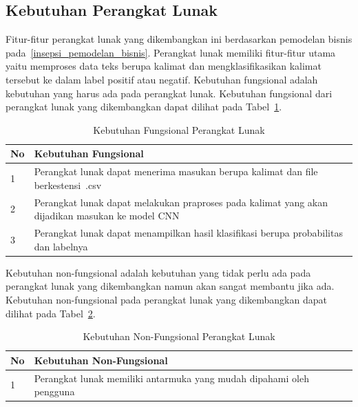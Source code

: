 \subsection{Kebutuhan Perangkat Lunak}
Fitur-fitur perangkat lunak yang dikembangkan ini berdasarkan pemodelan bisnis pada~\autoref{insepsi_pemodelan_bisnis}.
Perangkat lunak memiliki fitur-fitur utama yaitu memproses data teks berupa kalimat dan mengklasifikasikan
kalimat tersebut ke dalam label positif atau negatif. Kebutuhan fungsional adalah kebutuhan yang harus
ada pada perangkat lunak. Kebutuhan fungsional dari perangkat lunak yang dikembangkan dapat dilihat
pada Tabel~\ref{tab:kebutuhan_fungsional}.

\begin{table}[H]
  \centering
  \caption{Kebutuhan Fungsional Perangkat Lunak}
  \label{tab:kebutuhan_fungsional}
  \begin{tabularx}{\columnwidth}{|l|X|}
    \hline
    No & Kebutuhan Fungsional                                                                            \\ \hline
    1  & Perangkat lunak dapat menerima masukan berupa kalimat dan file berkestensi~.csv                 \\ \hline
    2  & Perangkat lunak dapat melakukan praproses pada kalimat yang akan dijadikan masukan ke model CNN \\ \hline
    3  & Perangkat lunak dapat menampilkan hasil klasifikasi berupa probabilitas dan labelnya            \\ \hline
  \end{tabularx}
\end{table}

Kebutuhan non-fungsional adalah kebutuhan yang tidak perlu ada pada perangkat lunak yang dikembangkan
namun akan sangat membantu jika ada. Kebutuhan non-fungsional pada perangkat lunak yang dikembangkan
dapat dilihat pada Tabel~\ref{tab:kebutuhan_nonfungsional}.

\begin{table}[H]
  \centering
  \caption{Kebutuhan Non-Fungsional Perangkat Lunak}
  \label{tab:kebutuhan_nonfungsional}
  \begin{tabularx}{\columnwidth}{|l|X|}
    \hline
    No & Kebutuhan Non-Fungsional                                             \\ \hline
    1  & Perangkat lunak memiliki antarmuka yang mudah dipahami oleh pengguna \\ \hline
  \end{tabularx}
\end{table}

